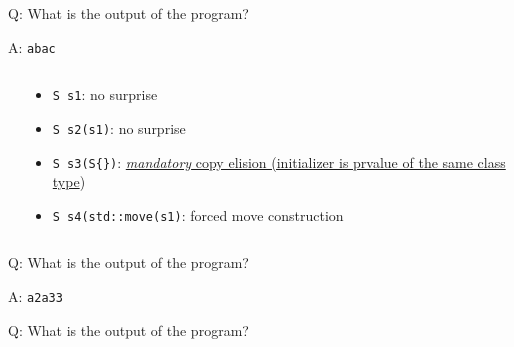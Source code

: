 \begin{frame}[fragile]{Q: What is the output of the program?}
\end{frame}

\begin{frame}[fragile]{A: \texttt{abac}}
    \begin{columns}
        \begin{column}{.5\textwidth}
        \end{column}
        \begin{column}{.45\textwidth}
            \begin{itemize}
                \item \texttt{S s1}: no surprise
                \item \texttt{S s2(s1)}: no surprise
                \item \texttt{S s3(S\{\})}: \href{https://en.cppreference.com/w/cpp/language/copy_elision}{\textit{mandatory} copy elision (initializer is prvalue of the same class type})
                \item \texttt{S s4(std::move(s1)}: forced move construction
            \end{itemize}
        \end{column}
    \end{columns}
\end{frame}

\begin{frame}[fragile]{Q: What is the output of the program?}
\end{frame}

\begin{frame}[fragile]{A: \texttt{a2a33}}
\end{frame}

\begin{frame}[fragile]{Q: What is the output of the program?}
\end{frame}

